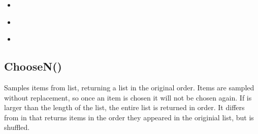 \documentclass[letterpaper,10pt,english]{sphinxmanual}
\begin{document}
\begin{sphinxShadowBox}
\begin{itemize}
\item {} 
\sphinxAtStartPar
{}\label{\detokenize{reference/design:id22}}{\hyperref[\detokenize{reference/design:functions-pending-documentation}]{}}

\item {} 
\sphinxAtStartPar
{}\label{\detokenize{reference/design:id23}}{\hyperref[\detokenize{reference/design:findtoken}]{}}

\item {} 
\sphinxAtStartPar
{}\label{\detokenize{reference/design:id24}}{\hyperref[\detokenize{reference/design:reverse}]{}}

\end{itemize}
\end{sphinxShadowBox}

\ignorespaces 

\subsection{ChooseN()}
\label{\detokenize{reference/design:choosen}}\label{\detokenize{reference/design:index-0}}
\sphinxAtStartPar
{}

\sphinxAtStartPar
Samples  items from list, returning   a list in the original order. Items are sampled without replacement, so   once an item is chosen it will not be chosen again. If    is larger than the length of the list, the entire   list is returned in order.  It differs from  in that    returns items in the order they appeared in the   originial list, but  is shuffled.

\sphinxAtStartPar
{}

\begin{sphinxVerbatim}[commandchars=\\\{\}]
\end{sphinxVerbatim}

\sphinxAtStartPar
{}
\end{document}
